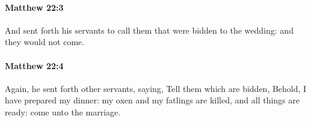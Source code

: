 		\paragraph{Matthew 22:3} %
			\label{MATTHEW-22-3}

			And sent forth his servants to call them that were bidden to the wedding: and they would not come.

			\begin{framed}
			\scriptsize
				\begin{compactdesc}
					\item[SBLG] 
				\end{compactdesc}
			\end{framed}

		\paragraph{Matthew 22:4} %
			\label{MATTHEW-22-4}

			Again, he sent forth other servants, saying, Tell them which are bidden, Behold, I have prepared my dinner: my oxen and my fatlings are killed, and all things are ready: come unto the marriage.

